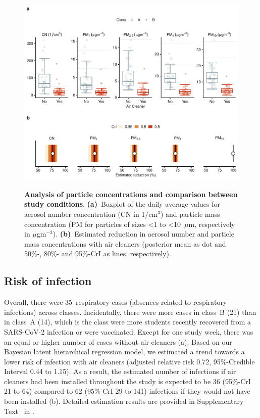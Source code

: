 \documentclass[fleqn,11pt]{wlscirep}
\begin{document}
\begin{figure}[!htpb]
\centering
    \includegraphics[width=\linewidth]{../../results/env-data/particles-boxplot.pdf}
    \includegraphics[width=\linewidth]{../../results/env-data/estimation-results-figure.pdf}
    \caption{\textbf{Analysis of particle concentrations and comparison between study conditions}. \textbf{(a)}~Boxplot of the daily average values for aerosol number concentration (CN in 1/cm$^3$) and particle mass concentration (PM for particles of sizes <1 to <10~$\mu$m, respectively in $\mu$gm$^{-3}$). \textbf{(b)}~Estimated reduction in aerosol number and particle mass concentrations with air cleaners (posterior mean as dot and 50\%-, 80\%- and 95\%-CrI as lines, respectively). }
    \label{fig:palas-results}
\end{figure}

\subsection{Risk of infection}

Overall, there were 35~respiratory cases (absences related to respiratory infections) across classes. Incidentally, there were more cases in class~B (21) than in class~A (14), which is the class were more students recently recovered from a SARS-CoV-2 infection or were vaccinated. Except for one study week, there was an equal or higher number of cases without air cleaners (a). Based on our Bayesian latent hierarchical regression model, we estimated a trend towards a lower risk of infection with air cleaners (adjusted relative risk 0.72, 95\%-Credible Interval 0.44 to 1.15). As a result, the estimated number of infections if air cleaners had been installed throughout the study is expected to be 36 (95\%-CrI 21 to 64) compared to 62 (95\%-CrI 29 to 141) infections if they would not have been installed (b). Detailed estimation results are provided in Supplementary Text~ in \supp. 
\end{document}
